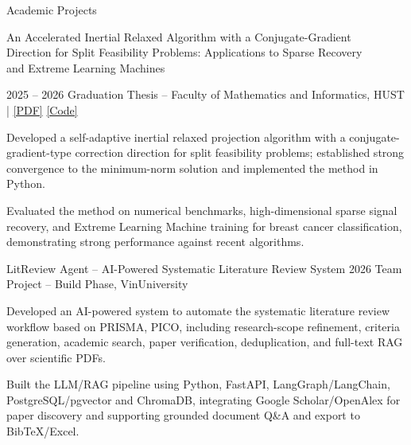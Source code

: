 \documentclass[
a4paper,
12pt,
]{resume}
\begin{document}
    \begin{rSection}{Academic Projects}
        \begin{rSubsection}
            {\parbox[t]{0.82\textwidth}{
                    An Accelerated Inertial Relaxed Algorithm with a Conjugate-Gradient \\Direction
                    for Split Feasibility Problems:
                    Applications to Sparse Recovery \\and Extreme Learning Machines
            }}
            {2025 -- 2026}
            {Graduation Thesis -- Faculty of Mathematics and Informatics, HUST \;|\;
                \href{https://github.com/lucasvahust/Graduation_Thesis_Nguyen_Van_Hung/blob/main/thesis/NguyenVanHung_Graduation_Thesis.pdf}{[PDF]}\;
                \href{https://github.com/lucasvahust/Graduation_Thesis_Nguyen_Van_Hung/tree/main/experiments}{[Code]}}
            {}

        
                \item Developed a self-adaptive inertial relaxed projection algorithm with a
                conjugate-gradient-type correction direction for split feasibility problems;
                established strong convergence to the minimum-norm solution and implemented
                the method in Python.
                
                \item Evaluated the method on numerical benchmarks, high-dimensional sparse
                signal recovery, and Extreme Learning Machine training for breast cancer
                classification, demonstrating strong performance against recent algorithms.
        \end{rSubsection}
        
        \begin{rSubsection}
            {LitReview Agent -- AI-Powered Systematic Literature Review System}
            {2026}
            {Team Project -- Build Phase, VinUniversity}
            {}
            
            \item Developed an AI-powered system to automate the systematic literature review
            workflow based on PRISMA, PICO, including research-scope refinement, criteria generation,
            academic search, paper verification, deduplication, and full-text RAG over scientific PDFs.
            
            \item Built the LLM/RAG pipeline using Python, FastAPI, LangGraph/LangChain,
            PostgreSQL/pgvector and ChromaDB, integrating Google Scholar/OpenAlex for paper discovery
            and supporting grounded document Q\&A and export to BibTeX/Excel.
            

\end{rSubsection}
\end{rSection}
\end{document}
